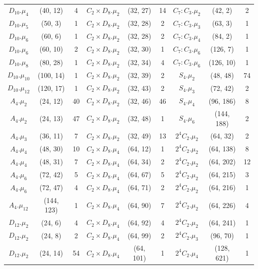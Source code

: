 \documentclass[a4paper]{amsart}
\theoremstyle{definition}
\theoremstyle{plain}
\begin{document}
{\begin{longtable}{ccc|ccc|ccc}
\rowcolor{lightgray}
$D_{10}.\mu_{4}$&(40, 12)&4 & $C_2 \times D_8.\mu_{2}$&(32, 27)&14 & $C_7:C_3.\mu_{2}$&(42, 2)&2\\
$D_{10}.\mu_{5}$&(50, 3)&1 & $C_2 \times D_8.\mu_{2}$&(32, 28)&2 & $C_7:C_3.\mu_{3}$&(63, 3)&1\\
\rowcolor{lightgray}
$D_{10}.\mu_{6}$&(60, 6)&1 & $C_2 \times D_8.\mu_{2}$&(32, 28)&2 & $C_7:C_3.\mu_{4}$&(84, 2)&1\\
$D_{10}.\mu_{6}$&(60, 10)&2 & $C_2 \times D_8.\mu_{2}$&(32, 30)&1 & $C_7:C_3.\mu_{6}$&(126, 7)&1\\
\rowcolor{lightgray}
$D_{10}.\mu_{8}$&(80, 28)&1 & $C_2 \times D_8.\mu_{2}$&(32, 34)&4 & $C_7:C_3.\mu_{6}$&(126, 10)&1\\
$D_{10}.\mu_{10}$&(100, 14)&1 & $C_2 \times D_8.\mu_{2}$&(32, 39)&2 & $S_4.\mu_{2}$&(48, 48)&74\\
\rowcolor{lightgray}
$D_{10}.\mu_{12}$&(120, 17)&1 & $C_2 \times D_8.\mu_{2}$&(32, 43)&2 & $S_4.\mu_{3}$&(72, 42)&2\\
$A_4.\mu_{2}$&(24, 12)&40 & $C_2 \times D_8.\mu_{2}$&(32, 46)&46 & $S_4.\mu_{4}$&(96, 186)&8\\
\rowcolor{lightgray}
$A_4.\mu_{2}$&(24, 13)&47 & $C_2 \times D_8.\mu_{2}$&(32, 48)&1 & $S_4.\mu_{6}$&(144, 188)&2\\
$A_4.\mu_{3}$&(36, 11)&7 & $C_2 \times D_8.\mu_{2}$&(32, 49)&13 & $2^4C_2.\mu_{2}$&(64, 32)&2\\
\rowcolor{lightgray}
$A_4.\mu_{4}$&(48, 30)&10 & $C_2 \times D_8.\mu_{4}$&(64, 12)&1 & $2^4C_2.\mu_{2}$&(64, 138)&8\\
$A_4.\mu_{4}$&(48, 31)&7 & $C_2 \times D_8.\mu_{4}$&(64, 34)&2 & $2^4C_2.\mu_{2}$&(64, 202)&12\\
\rowcolor{lightgray}
$A_4.\mu_{6}$&(72, 42)&5 & $C_2 \times D_8.\mu_{4}$&(64, 67)&5 & $2^4C_2.\mu_{2}$&(64, 215)&3\\
$A_4.\mu_{6}$&(72, 47)&4 & $C_2 \times D_8.\mu_{4}$&(64, 71)&2 & $2^4C_2.\mu_{2}$&(64, 216)&1\\
\rowcolor{lightgray}
$A_4.\mu_{12}$&(144, 123)&1 & $C_2 \times D_8.\mu_{4}$&(64, 90)&7 & $2^4C_2.\mu_{2}$&(64, 226)&4\\
$D_{12}.\mu_{2}$&(24, 6)&4 & $C_2 \times D_8.\mu_{4}$&(64, 92)&4 & $2^4C_2.\mu_{2}$&(64, 241)&1\\
\rowcolor{lightgray}
$D_{12}.\mu_{2}$&(24, 8)&2 & $C_2 \times D_8.\mu_{4}$&(64, 99)&2 & $2^4C_2.\mu_{3}$&(96, 70)&1\\
$D_{12}.\mu_{2}$&(24, 14)&54 & $C_2 \times D_8.\mu_{4}$&(64, 101)&1 & $2^4C_2.\mu_{4}$&(128, 621)&1\\

\end{longtable}}
\end{document}
